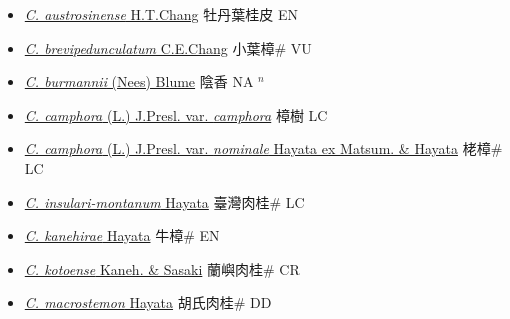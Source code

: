 \begin{itemize}
  \begin{itemize}
        \item[] \href{http://www.theplantlist.org/tpl1.1/search?q=Cinnamomum+austrosinense}{\textit{C. austrosinense} H.T.Chang}   牡丹葉桂皮 EN
        \item[] \href{http://www.theplantlist.org/tpl1.1/search?q=Cinnamomum+brevipedunculatum}{\textit{C. brevipedunculatum} C.E.Chang}   小葉樟\# VU
        \item[] \href{http://www.theplantlist.org/tpl1.1/search?q=Cinnamomum+burmannii}{\textit{C. burmannii} (Nees) Blume}   陰香 NA $^n$
        \item[] \href{http://www.theplantlist.org/tpl1.1/search?q=Cinnamomum+camphora+var.+camphora}{\textit{C. camphora} (L.) J.Presl. var. \textit{camphora}}   樟樹 LC
        \item[] \href{http://www.theplantlist.org/tpl1.1/search?q=Cinnamomum+camphora+var.+nominale}{\textit{C. camphora} (L.) J.Presl. var. \textit{nominale} Hayata ex Matsum. \& Hayata}   栳樟\# LC
        \item[] \href{http://www.theplantlist.org/tpl1.1/search?q=Cinnamomum+insulari-montanum}{\textit{C. insulari-montanum} Hayata}   臺灣肉桂\# LC
        \item[] \href{http://www.theplantlist.org/tpl1.1/search?q=Cinnamomum+kanehirae}{\textit{C. kanehirae} Hayata}   牛樟\# EN
        \item[] \href{http://www.theplantlist.org/tpl1.1/search?q=Cinnamomum+kotoense}{\textit{C. kotoense} Kaneh. \& Sasaki}   蘭嶼肉桂\# CR
        \item[] \href{http://www.theplantlist.org/tpl1.1/search?q=Cinnamomum+macrostemon}{\textit{C. macrostemon} Hayata}   胡氏肉桂\# DD

\end{itemize}
\end{itemize}
